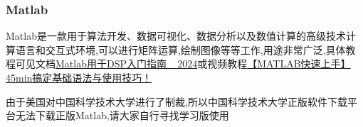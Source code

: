 \documentclass{ctexart}
\begin{document}
\subsubsection{Matlab}
Matlab是一款用于算法开发、数据可视化、数据分析以及数值计算的高级技术计算语言和交互式环境,可以进行矩阵运算,绘制图像等等工作,用途非常广泛,具体教程可见文档\href{https://github.com/kiri236/Guide-for-exchange-student-in-USTC/blob/main/docs/Matlab/Matlab%E7%94%A8%E4%BA%8EDSP%E5%85%A5%E9%97%A8%E6%8C%87%E5%8D%97_2024.docx}{Matlab用于DSP入门指南\_ 2024}或视频教程\href{https://www.bilibili.com/video/BV13kHVeMETZ/?spm_id_from=333.337.search-card.all.click&vd_source=1780915c6fb454598df0a5b955fb7565}{【MATLAB快速上手】45min搞定基础语法与使用技巧！}
\par 由于美国对中国科学技术大学进行了制裁,所以中国科学技术大学正版软件下载平台无法下载正版Matlab,请大家自行寻找学习版使用
\end{document}
